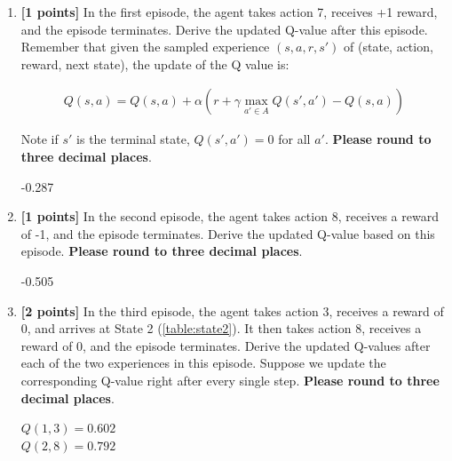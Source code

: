 \documentclass[11pt]{article}
\numberwithin{equation}{section} %
\numberwithin{figure}{section} %
\numberwithin{table}{section} %
\begin{document}
\begin{enumerate}
\item \textbf{[1 points]} In the first episode, the agent takes action 7, receives +1 reward, and the episode terminates. Derive the updated Q-value after this episode. Remember that given the sampled experience $(s, a, r, s')$ of (state, action, reward, next state), the update of the Q value is:

\begin{align}
Q(s, a) = Q(s, a) + \alpha \left(r + \gamma \max_{a' \in A}Q(s', a') - Q(s,a) \right)
\end{align}

Note if $s'$ is the terminal state, $Q(s', a') = 0$ for all $a'$.  \textbf{Please round to three decimal places}.

\begin{tcolorbox}[fit,height=1cm, width=\linewidth, blank, borderline={1pt}{-2pt},nobeforeafter]
    \begin{center}\huge-0.287\end{center}
\end{tcolorbox}


\item \textbf{[1 points]} In the second episode, the agent takes action 8, receives a reward of -1, and the episode terminates. Derive the updated Q-value based on this episode.  \textbf{Please round to three decimal places}.

\begin{tcolorbox}[fit,height=1cm, width=\linewidth, blank, borderline={1pt}{-2pt},nobeforeafter]
    \begin{center}\huge-0.505\end{center}
\end{tcolorbox}


\item \textbf{[2 points]} In the third episode, the agent takes action 3, receives a reward of 0, and arrives at State 2 (\ref{table:state2}). It then takes action 8, receives a reward of 0, and the episode terminates. Derive the updated Q-values after each of the two experiences in this episode. Suppose we update the corresponding Q-value right after every single step.
 \textbf{Please round to three decimal places}.

\begin{tcolorbox}[fit,height=3cm, width=\linewidth, blank, borderline={1pt}{-2pt},nobeforeafter]
	$Q(1,3)=0.602$\\
	$Q(2,8)=0.792$
\end{tcolorbox}



\end{enumerate}
\end{document}
